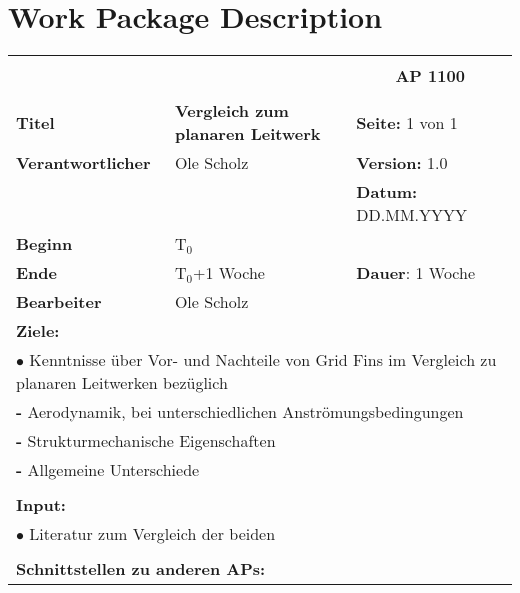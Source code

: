 \section{Work Package Description}
\label{sec:wpd}
\begin{table}[!h]
	\begin{center}
		\begin{tabular}{|p{35mm}||p{55mm}|p{50mm}||p{40mm}|}
			\hline
			\multicolumn{3}{|l||}{\textbf{}} & \multicolumn{1}{c|}{}\\
			\multicolumn{3}{|l||}{\textbf{}} & \multicolumn{1}{c|}{\textbf{AP 1100}}\\
			\multicolumn{3}{|l||}{\textbf{}} & \multicolumn{1}{c|}{}\\
			\hline\hline
			\textbf{Titel} & \multicolumn{2}{p{7cm}||}{\textbf{Vergleich zum planaren Leitwerk}} 
			& \textbf{Seite:} 1 von 1\\
			\hline
			\textbf{Verantwortlicher} & \multicolumn{2}{l||}{Ole Scholz} & \textbf{Version:} 1.0\\
			\hline
			\multicolumn{3}{|l||}{} & \textbf{Datum:} DD.MM.YYYY\\
			\hline\hline
			\textbf{Beginn} & \multicolumn{2}{l||}{T$_0$} & \\
			\hline
			\textbf{Ende} & \multicolumn{2}{l||}{T$_0$+1 Woche} & \textbf{Dauer}: 1 Woche\\
			\hline\hline
			\textbf{Bearbeiter} & \multicolumn{3}{l|}{Ole Scholz}\\
			\hline\hline
			\multicolumn{4}{|p{150mm}|}{\textbf{Ziele:}}\\
			\multicolumn{4}{|p{150mm}|}{$\bullet$ Kenntnisse über Vor- und Nachteile von Grid Fins im Vergleich zu planaren Leitwerken bezüglich}\\
			\multicolumn{4}{|p{150mm}|}{\qquad \textbf{-} Aerodynamik, bei unterschiedlichen Anströmungsbedingungen}\\
			\multicolumn{4}{|p{150mm}|}{\qquad \textbf{-} Strukturmechanische Eigenschaften}\\
			\multicolumn{4}{|p{150mm}|}{\qquad \textbf{-} Allgemeine Unterschiede}\\
			\multicolumn{4}{|p{150mm}|}{}\\
			\multicolumn{4}{|p{150mm}|}{\textbf{Input:}}\\
			\multicolumn{4}{|p{150mm}|}{$\bullet$ Literatur zum Vergleich der beiden}\\
			\multicolumn{4}{|p{150mm}|}{}\\
			\multicolumn{4}{|p{150mm}|}{\textbf{Schnittstellen zu anderen APs:}}\\

\end{tabular}
\end{center}
\end{table}
